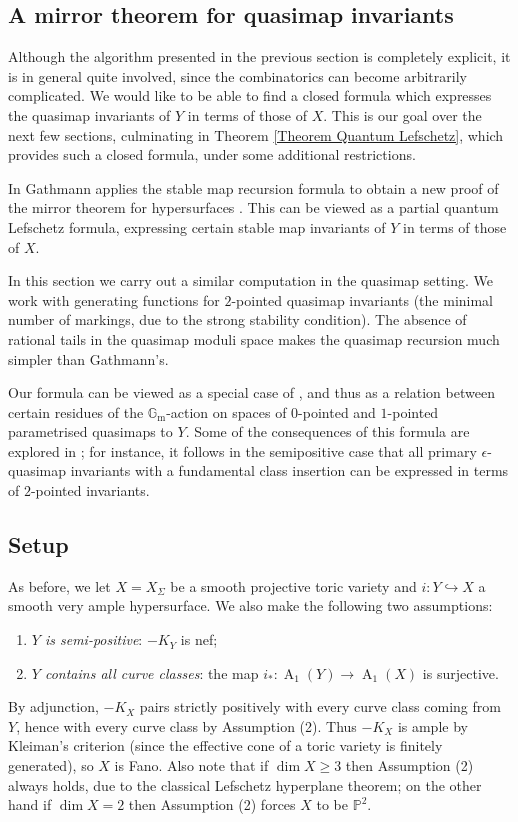 \documentclass[10pt]{amsart}
\newcommand{\PP}{\mathbb P}
\renewcommand{\to}{\rightarrow}
\newcommand{\Gm}{\mathbb{G}_{\text{m}}}
\newcommand{\Achow}{\operatorname{A}}
\theoremstyle{definition}
\theoremstyle{definition}
\begin{document}
\subsection{A mirror theorem for quasimap invariants}
Although the algorithm presented in the previous section is completely explicit, it is in general quite involved, since the combinatorics can become arbitrarily complicated. We would like to be able to find a closed formula which expresses the quasimap invariants of $Y$ in terms of those of $X$. This is our goal over the next few sections, culminating in Theorem \ref{Theorem Quantum Lefschetz}, which provides such a closed formula, under some additional restrictions.

In \cite{Ga-MF} Gathmann applies the stable map recursion formula to obtain a new proof of the mirror theorem for hypersurfaces \cite{Givental-equivariantGW}. This can be viewed as a partial quantum Lefschetz formula, expressing certain stable map invariants of $Y$ in terms of those of $X$.

In this section we carry out a similar computation in the quasimap setting. We work with generating functions for $2$-pointed quasimap invariants (the minimal number of markings, due to the strong stability condition). The absence of rational tails in the quasimap moduli space makes the quasimap recursion much simpler than Gathmann's.

Our formula can be viewed as a special case of \cite[Corollary 5.5.1]{CF-K-wallcrossing}, and thus as a relation between certain residues of the $\Gm$-action on spaces of $0$-pointed and $1$-pointed parametrised quasimaps to $Y$. Some of the consequences of this formula are explored in \cite[Section 5.5]{CF-K-wallcrossing}; for instance, it follows in the semipositive case that all primary $\epsilon$-quasimap invariants with a fundamental class insertion can be expressed in terms of $2$-pointed invariants.

\subsection{Setup} \label{Subsection setup}
As before, we let $X=X_{\Sigma}$ be a smooth projective toric variety and $i \colon Y \hookrightarrow X$ a smooth very ample hypersurface. We also make the following two assumptions:
\begin{enumerate}
\item \emph{$Y$ is semi-positive}: $-K_Y$ is nef;
\item \emph{$Y$ contains all curve classes}: the map $i_* : \Achow_1(Y) \to \Achow_1(X)$ is surjective.
\end{enumerate}
By adjunction, $-K_X$ pairs strictly positively with every curve class coming from $Y$, hence with every curve class by Assumption (2). Thus $-K_X$ is ample by Kleiman's criterion (since the effective cone of a toric variety is finitely generated), so $X$ is Fano. Also note that if $\dim X \geq 3$ then Assumption (2) always holds, due to the classical Lefschetz hyperplane theorem; on the other hand if $\dim X = 2$ then Assumption (2) forces $X$ to be $\PP^2$.
\end{document}
